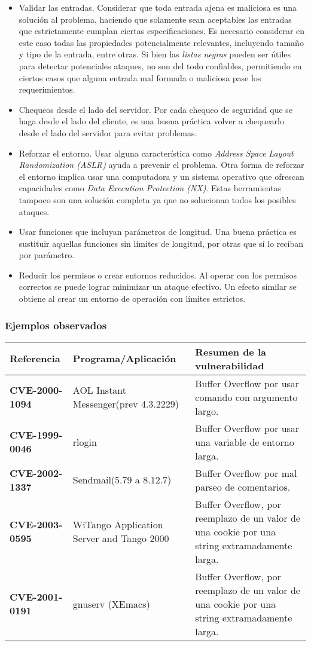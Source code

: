 \begin{itemize}
    \item Validar las entradas.
	Considerar que toda entrada ajena es maliciosa es una solución al problema, haciendo que solamente sean aceptables las entradas que estrictamente cumplan ciertas especificaciones.
	Es necesario considerar en este caso todas las propiedades potencialmente relevantes, incluyendo tamaño y tipo de la entrada, entre otras.
	Si bien las \textit{listas negras} pueden ser útiles para detectar potenciales ataques, no son del todo confiables, permitiendo en ciertos casos que alguna entrada mal formada o maliciosa
	pase los requerimientos.
    \item Chequeos desde el lado del servidor. Por cada chequeo de seguridad que se haga desde el lado del cliente, es una buena práctica volver a chequearlo desde el lado del servidor para
	evitar problemas.
    \item Reforzar el entorno. Usar alguna característica como \textit{Address Space Layout Randomization (ASLR)} ayuda a prevenir el problema.
	Otra forma de reforzar el entorno implica usar una computadora y un sistema operativo que ofrescan capacidades como \textit{Data Execution Protection (NX)}.
	Estas herramientas tampoco son una solución completa ya que no solucionan todos los posibles ataques.
    \item Usar funciones que incluyan parámetros de longitud. Una buena práctica es sustituir aquellas funciones sin límites de longitud, por otras que sí lo reciban por parámetro.

    \item Reducir los permisos o crear entornos reducidos. Al operar con los permisos correctos se puede lograr minimizar un ataque efectivo. Un efecto similar se obtiene al crear un
	entorno de operación con límites estrictos.
\end{itemize}

\subsubsection{Ejemplos observados}

\begin{tabular}[\baselineskip]{|p{1.75cm}|p{3.5cm}|p{8cm}|}
  \hline
  \textbf{Referencia} & Programa/Aplicación & Resumen de la vulnerabilidad \\
  \hline
  \textbf{CVE-2000- 1094} & AOL Instant Messenger(prev 4.3.2229) & Buffer Overflow por usar comando con argumento largo. \\
  \hline
  \textbf{CVE-1999- 0046} & rlogin & Buffer Overflow por usar una variable de entorno larga. \\
  \hline
  \textbf{CVE-2002- 1337} & Sendmail(5.79 a 8.12.7) & Buffer Overflow por mal parseo de comentarios. \\
  \hline
  \textbf{CVE-2003- 0595} & WiTango Application Server and Tango 2000 & Buffer Overflow, por reemplazo de un valor de una cookie por una string extramadamente larga.\\
  \hline
  \textbf{CVE-2001- 0191} & gnuserv (XEmacs) & Buffer Overflow, por reemplazo de un valor de una cookie por una string extramadamente larga. \\
  \hline
\end{tabular}
